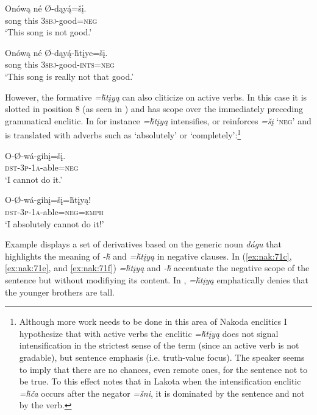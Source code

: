 \documentclass[output=paper,colorlinks,citecolor=brown]{langscibook}
\begin{document}
\ea\label{ex:nak:69}
    \ea\label{ex:nak:69a}
        \gll Onówą né Ø-dąy\'{ą}=šį. \\
             song this \textsc{3sbj}-good=\textsc{neg} \\
        \glt ‘This song is not good.’
    
    \ex\label{ex:nak:69b}
        \gll Onówą né Ø-dąy\'{ą}-ȟtįye=šį. \\
             song this \textsc{3sbj}-good-\textsc{ints=neg} \\
        \glt ‘This song is really not that good.’
    \z
\z 

However, the formative \textit{=ȟtįyą} can also cliticize on active verbs. In this case it is slotted in position 8 (as seen in ) and has scope over the immediately preceding grammatical enclitic. In  for instance \textit{=ȟtįyą} intensifies, or reinforces \textit{=šį} ‘\textsc{neg}’ and is translated with adverbs such as ‘absolutely’ or ‘completely’:\footnote{Although more work needs to be done in this area of Nakoda enclitics I hypothesize that with active verbs the enclitic \textit{=ȟtįyą} does not signal intensification in the strictest sense of the term (since an active verb is not gradable), but sentence emphasis (i.e. truth-value focus). The speaker seems to imply that there are no chances, even remote ones, for the sentence not to be true. To this effect \citet[157]{deReuse1982} notes that in Lakota when the intensification enclitic \textit{=ȟča} occurs after the negator \textit{=šni}, it is dominated by the sentence and not by the verb.}

\ea\label{ex:nak:70}
    \ea\label{ex:nak:70a}
        \gll O-Ø-wá-gihį=šį. \\
             \textsc{dst-3p-1a}-able=\textsc{neg} \\
        \glt ‘I cannot do it.’
    
    \ex\label{ex:nak:70b}
        \gll O-Ø-wá-gihį=šį=ȟtįyą! \\
             \textsc{dst-3p-1a}-able=\textsc{neg=emph} \\
        \glt ‘I absolutely cannot do it!’
    \z
\z 

Example  displays a set of derivatives based on the generic noun \textit{dágu} that highlights the meaning of \textit{-ȟ} and \textit{=ȟtįyą} in negative clauses. In (\ref{ex:nak:71c}, \ref{ex:nak:71e}, and \ref{ex:nak:71f}) \textit{=ȟtįyą} and \textit{-ȟ} accentuate the negative scope of the sentence but without modifiying its content. In , \textit{=ȟtįyą} emphatically denies that the younger brothers are tall.
\end{document}
